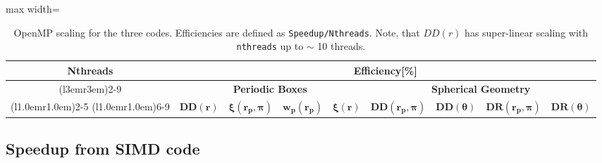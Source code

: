 \documentclass[preprint, 12pt, authoryear]{elsarticle}
\newcommand{\xir}{\ensuremath{{DD(r)}}\xspace}
\newcommand{\xiofr}{\ensuremath{{\xi(r)}}\xspace}
\newcommand{\wprp}{\ensuremath{{w_p(r_p)}}\xspace}
\newcommand{\xirppi}{\ensuremath{{\xi(r_p,\pi)}}\xspace}
\begin{document}
\begin{table}
\centering
\caption{\footnotesize OpenMP scaling for the three codes. Efficiencies are defined 
as \texttt{Speedup/Nthreads}. Note, that \xir has super-linear scaling with \texttt{nthreads}
up to $\sim$ 10 threads.}
\begin{adjustbox}{max width=\textwidth}
\begin{tabular}{ccccccccc} 
\toprule
\multirow{3}{*}{\textbf{Nthreads}}   &
\multicolumn{8}{c}{\textbf{Efficiency[\%]}} \\
\cmidrule(l{3em}r{3em}){2-9}

                                     &
\multicolumn{4}{c}{\textbf{Periodic Boxes}}  &
\multicolumn{4}{c}{\textbf{Spherical Geometry}}  \\
\cmidrule(l{1.0em}r{1.0em}){2-5}
\cmidrule(l{1.0em}r{1.0em}){6-9}
                                               &
\multicolumn{1}{c}{$\boldsymbol{\xir}$}        &
\multicolumn{1}{c}{$\boldsymbol{\xirppi}$}     &
\multicolumn{1}{c}{$\boldsymbol{\wprp}$}       & 
\multicolumn{1}{c}{$\boldsymbol{\xiofr}$}      &
\multicolumn{1}{c}{$\boldsymbol{DD(r_p,\pi)}$} &
\multicolumn{1}{c}{$\boldsymbol{DD(\theta)}$}  &
\multicolumn{1}{c}{$\boldsymbol{DR(r_p,\pi)}$} & 
\multicolumn{1}{c}{$\boldsymbol{DR(\theta)}$}   \\
\midrule

\bottomrule
\end{tabular}
\end{adjustbox}
\label{table:openmp}
\end{table}

\subsection{Speedup from SIMD code}
\end{document}
